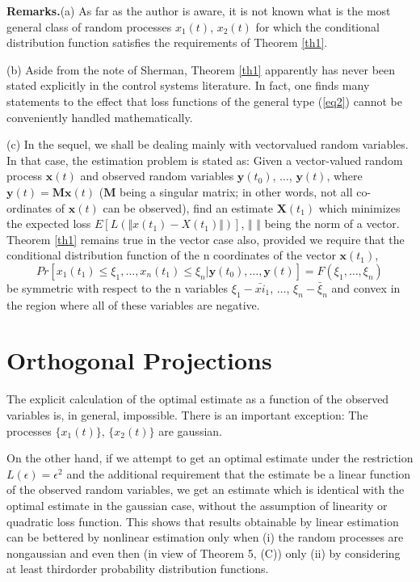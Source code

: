\documentclass{article}
\begin{document}
\textbf{Remarks.}(a) As far as the author is aware, it is not known what is the most general class of random processes ${x_1(t)}$, ${x_2(t)}$ for which the conditional distribution function satisfies the requirements of Theorem \ref{th1}.

(b) Aside from the note of Sherman, Theorem \ref{th1} apparently has never been stated explicitly in the control systems literature. In fact, one finds many statements to the effect that loss functions of the general type (\ref{eq2}) cannot be conveniently handled mathematically.

(c) In the sequel, we shall be dealing mainly with vectorvalued random variables. In that case, the estimation problem is stated as: Given a vector-valued random process ${\mathbf{x}(t)}$ and observed random variables $\mathbf{y}(t_0)$, $\dotsc$, $\mathbf{y}(t)$, where $\mathbf{y}(t) = \mathbf{M}\mathbf{x}(t)$ ($\mathbf{M}$ being a singular matrix; in other words, not all co-ordinates of $\mathbf{x}(t)$ can be observed), find an estimate $\mathbf{X}(t_1)$ which minimizes the expected loss $E[L(\Vert x(t_1) - X(t_1)\Vert)]$, $\Vert$ $\Vert$ being the norm of a vector. Theorem \ref{th1} remains true in the vector case also, provided we require that the conditional distribution function of the n coordinates of the vector $\mathbf{x}(t_1)$,
\begin{equation*}
Pr[x_1(t_1) \le \xi_1,\dotsc,x_n(t_1) \le \xi_n \vert \mathbf{y}(t_0),\dotsc,\mathbf{y}(t)]=F(\xi_1,\dotsc,\xi_n)
\end{equation*}
be symmetric with respect to the n variables $\xi_1 - \bar{xi}_1$, $\dotsc$, $\xi_n - \bar{\xi}_n$ and convex in the region where all of these variables are negative.

\section{Orthogonal Projections}
The explicit calculation of the optimal estimate as a function of the observed variables is, in general, impossible. There is an important exception: The processes $\{x_1(t)\}$, $\{x_2(t)\}$ are gaussian.

On the other hand, if we attempt to get an optimal estimate under the restriction $L(\epsilon) = \epsilon^2$ and the additional requirement that the estimate be a linear function of the observed random variables, we get an estimate which is identical with the optimal estimate in the gaussian case, without the assumption of linearity or quadratic loss function. This shows that results obtainable by linear estimation can be bettered by nonlinear estimation only when (i) the random processes are nongaussian and even then (in view of Theorem 5, (C)) only (ii) by considering at least thirdorder probability distribution functions.
\end{document}
